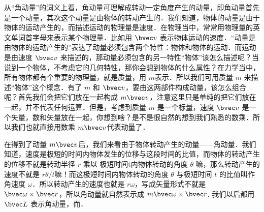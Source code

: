 
从“角动量”的词义上看，角动量可理解成转动一定角度产生的动量，即角动量首先是一个动量，其次这个动量是由物体的转动产生的．我们知道，物体的动量是由于物体的运动产生的，而描述运动的物理量是速度．在物理当中，常常用物理量的英文单词首字母来表示某个物理量．比如用 $\bvec v$ 表示物体运动的速度．“动量是由物体的运动产生的”表达了动量必须包含两个特性：物体和物体的运动．而运动是由速度 $\bvec v$ 来描述的，那动量必须包含的另一特性“物体”该怎么描述呢？当说到一个物体，不考虑它的几何特性，那你会想到物体的什么属性？在力学当中，所有物体都有个重要的物理量，就是质量，用 $m$表示．所以我们可用质量 $m$ 来描述“物体”这个概念．有了 $m$ 和 $\bvec v$，要由这两部件构成动量，该怎么组合呢？首先我们会把它们放在一起构成 $m\bvec v$，注意这里只是单纯的把它们放在一起，并不代表任何运算．但是，考虑到质量 $m$ 是一个标量，速度 $\bvec v$ 是一个矢量，数和矢量放在一起，你想到啥？是不是很自然的想到我们熟悉的数乘．所以我们也就直接用数乘 $m\bvec v$代表动量了．

在得到了动量 $m\bvec v$后，我们来看由于物体转动产生的动量——角动量．我们知道，速度是极短的时间内物体发生的位移与这段时间的比值，而物体的转动产生的位移不就是转动半径 $r$ 乘以 极短时间t内物体转动的角度 $\theta$ 嘛，那么转动产生的速度不就是 $r\theta/t$嘛！而这极短时间内物体转动的角度 $\theta$ 与极短时间 $t$ 的比值叫作角速度 $\omega$．所以转动产生的速度也就是 $r\omega$，写成矢量形式不就是 $\bvec \omega\times \bvec r$，所以角动量就自然表示成 $m\bvec \omega\times \bvec r$. 我们以后都用 $\bvec L$ 表示角动量，而．